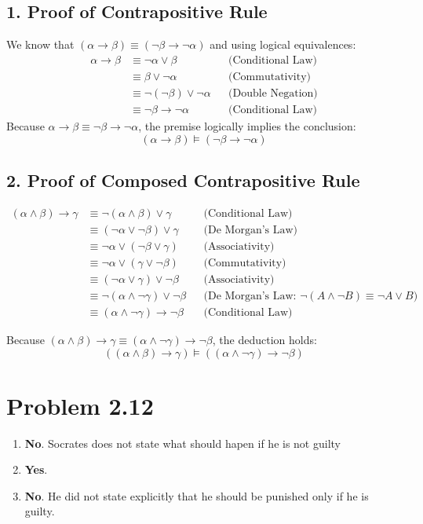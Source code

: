 \documentclass[12pt]{article}
\begin{document}
\subsection*{1. Proof of Contrapositive Rule}
We know that $(\alpha \to \beta) \equiv (\neg\beta \to \neg\alpha)$ and using logical equivalences:
\begin{align*}
\alpha \to \beta &\equiv \neg\alpha \lor \beta && \text{(Conditional Law)} \\
&\equiv \beta \lor \neg\alpha && \text{(Commutativity)} \\
&\equiv \neg(\neg\beta) \lor \neg\alpha && \text{(Double Negation)} \\
&\equiv \neg\beta \to \neg\alpha && \text{(Conditional Law)}
\end{align*}
Because $\alpha \to \beta \equiv \neg\beta \to \neg\alpha$, the premise logically implies the conclusion:
\[
(\alpha \to \beta) \models (\neg\beta \to \neg\alpha)
\]

\subsection*{2. Proof of Composed Contrapositive Rule}
\begin{align*}
(\alpha \land \beta) \to \gamma 
&\equiv \neg(\alpha \land \beta) \lor \gamma && \text{(Conditional Law)} \\
&\equiv (\neg\alpha \lor \neg\beta) \lor \gamma && \text{(De Morgan's Law)} \\
&\equiv \neg\alpha \lor (\neg\beta \lor \gamma) && \text{(Associativity)} \\
&\equiv \neg\alpha \lor (\gamma \lor \neg\beta) && \text{(Commutativity)} \\
&\equiv (\neg\alpha \lor \gamma) \lor \neg\beta && \text{(Associativity)} \\
&\equiv \neg(\alpha \land \neg\gamma) \lor \neg\beta && \text{(De Morgan's Law: } \neg(A \land \neg B) \equiv \neg A \lor B\text{)} \\
&\equiv (\alpha \land \neg\gamma) \to \neg\beta && \text{(Conditional Law)}
\end{align*}

Because $(\alpha \land \beta) \to \gamma \equiv (\alpha \land \neg\gamma) \to \neg\beta$, the deduction holds:
\[
((\alpha \land \beta) \to \gamma) \models ((\alpha \land \neg\gamma) \to \neg\beta)
\]

\section*{Problem 2.12}
    \begin{enumerate}
    \renewcommand{\labelenumi}{\alph{enumi})}
    \item \textbf{No}. Socrates does not state what should hapen if he is not guilty
    \item \textbf{Yes}.
    \item \textbf{No}. He did not state explicitly that he should be punished only if he is guilty.
\end{enumerate}
\end{document}
